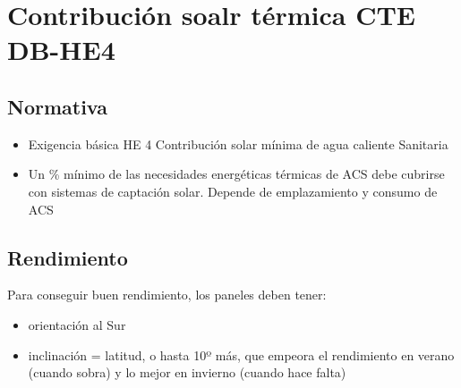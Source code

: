 \chapter{Contribución soalr térmica CTE DB-HE4}
\section{Normativa}
\begin{itemize}
    \item Exigencia básica HE 4 Contribución solar mínima de agua caliente Sanitaria
    \item Un \% mínimo de las necesidades energéticas térmicas de ACS debe cubrirse con sistemas de captación solar.
    \subitem Depende de emplazamiento y consumo de ACS
\end{itemize}

\section{Rendimiento}
Para conseguir buen rendimiento, los paneles deben tener:
\begin{itemize}
    \item orientación al Sur
    \item inclinación = latitud, o hasta 10º más, que empeora el rendimiento en verano (cuando sobra) y lo mejor en invierno (cuando hace falta)    
\end{itemize}
